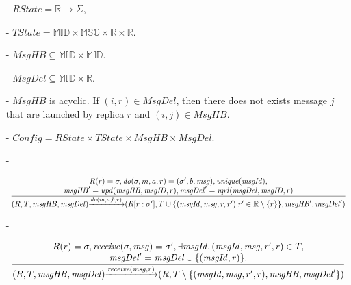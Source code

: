 \begin{itemize}
\setlength{\itemsep}{0.5pt}
\item[-] $\mathit{RState} = \mathbb{R} \rightarrow \Sigma$,

\item[-] $\mathit{TState} = \mathbb{MID} \times \mathbb{MSG} \times \mathbb{R} \times \mathbb{R}$.

\item[-] $\mathit{MsgHB} \subseteq \mathbb{MID} \times \mathbb{MID}$.

\item[-] $\mathit{MsgDel}\subseteq \mathbb{MID} \times \mathbb{R}$.

\item[-] $\mathit{MsgHB}$ is acyclic. If $(i,r) \in \mathit{MsgDel}$, then there does not exists message $j$ that are launched by replica $r$ and $(i,j) \in \mathit{MsgHB}$.

\item[-] $\mathit{Config} = \mathit{RState} \times \mathit{TState} \times \mathit{MsgHB} \times \mathit{MsgDel}$.

\item[-]

$\begin{array}{l c}
   \bigfrac{
   \begin{array}{c}
     R(r) = \sigma, \mathit{do}(\sigma,m,a,r) = (\sigma',b,\mathit{msg}), \mathit{unique}(\mathit{msgId}), \\
     \mathit{msgHB}' = \mathit{upd}(\mathit{msgHB},\mathit{msgID},r) ,\mathit{msgDel}' = \mathit{upd}(\mathit{msgDel},\mathit{msgID},r)
   \end{array}}
     {(R,T,\mathit{msgHB},\mathit{msgDel}) {\xrightarrow{\mathit{do}(m,a,b,r)}} (R[r:\sigma'],T \cup \{ (\mathit{msgId},\mathit{msg},r,r') \vert r' \in \mathbb{R} \setminus \{ r \} \}, \mathit{msgHB}',\mathit{msgDel}')}
\end{array}$

\item[-]

$\begin{array}{l c}
   \bigfrac{
   \begin{array}{c}
      R(r) = \sigma, \mathit{receive}(\sigma,\mathit{msg}) = \sigma', \exists \mathit{msgId},(\mathit{msgId},\mathit{msg},r',r) \in T, \\
      \mathit{msgDel}' = \mathit{msgDel} \cup \{ (\mathit{msgId},r) \}.
   \end{array}}
     {(R,T,\mathit{msgHB},\mathit{msgDel}) {\xrightarrow{\mathit{receive}(\mathit{msg},r)}} (R,T \setminus \{ (\mathit{msgId},\mathit{msg},r',r),\mathit{msgHB},\mathit{msgDel}' \} )}
\end{array}$
\end{itemize}

